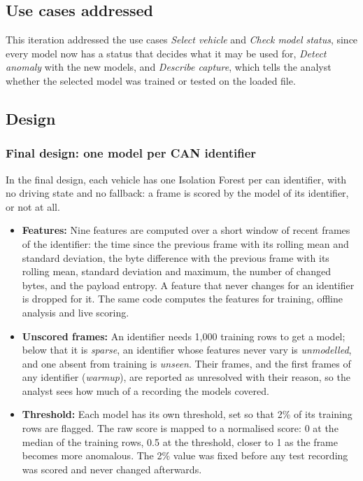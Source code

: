 \subsection{Use cases addressed}

This iteration addressed the use cases \emph{Select vehicle} and \emph{Check model status}, since every model now has a status that decides what it may be used for, \emph{Detect anomaly} with the new models, and \emph{Describe capture}, which tells the analyst whether the selected model was trained or tested on the loaded file.

\subsection{Design}

\subsubsection{Final design: one model per CAN identifier}
\label{sec:impl-feature-eng}

In the final design, each vehicle has one Isolation Forest per \gls{can} identifier, with no driving state and no fallback: a frame is scored by the model of its identifier, or not at all.

\begin{itemize}
    \item \textbf{Features:} Nine features are computed over a short window of recent frames of the identifier: the time since the previous frame with its rolling mean and standard deviation, the byte difference with the previous frame with its rolling mean, standard deviation and maximum, the number of changed bytes, and the payload entropy. A feature that never changes for an identifier is dropped for it. The same code computes the features for training, offline analysis and live scoring.
    \item \textbf{Unscored frames:} An identifier needs 1{,}000 training rows to get a model; below that it is \emph{sparse}, an identifier whose features never vary is \emph{unmodelled}, and one absent from training is \emph{unseen}. Their frames, and the first frames of any identifier (\emph{warmup}), are reported as unresolved with their reason, so the analyst sees how much of a recording the models covered.
    \item \textbf{Threshold:} Each model has its own threshold, set so that 2\% of its training rows are flagged. The raw score is mapped to a normalised score: 0 at the median of the training rows, 0.5 at the threshold, closer to 1 as the frame becomes more anomalous. The 2\% value was fixed before any test recording was scored and never changed afterwards.
\end{itemize}

